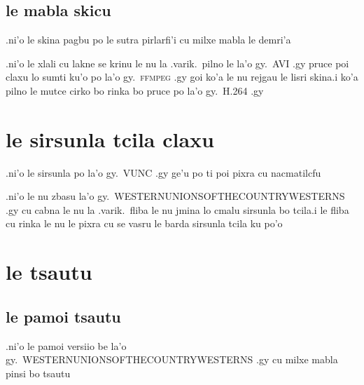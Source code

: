 \documentclass{report}
\begin{document}
\subsection{le mabla skicu}
.ni'o le skina pagbu po le sutra pirlarfi'i cu milxe mabla le demri'a

.ni'o le xlali cu lakne se krinu le nu la .varik.\ pilno le la'o gy.\ AVI .gy pruce poi claxu lo sumti ku'o po la'o gy.\ \textsc{ffmpeg} .gy goi ko'a le nu rejgau le lisri skina\@  .i ko'a pilno le mutce cirko bo rinka bo pruce po la'o gy.\ H.264 .gy

\section{le sirsunla tcila claxu}
.ni'o le sirsunla po la'o gy.\ VUNC .gy ge'u po ti poi pixra cu nacmatilcfu

.ni'o le nu zbasu la'o gy.\ WESTERNUNIONSOFTHECOUNTRYWESTERNS .gy cu cabna le nu la .varik.\ fliba le nu jmina lo cmalu sirsunla bo tcila\@  .i le fliba cu rinka le nu le pixra cu se vasru le barda sirsunla tcila ku po'o

\section{le tsautu}
\subsection{le pamoi tsautu}
.ni'o le pamoi versiio be la'o gy.\ WESTERNUNIONSOFTHECOUNTRYWESTERNS .gy cu milxe mabla pinsi bo tsautu
\end{document}
